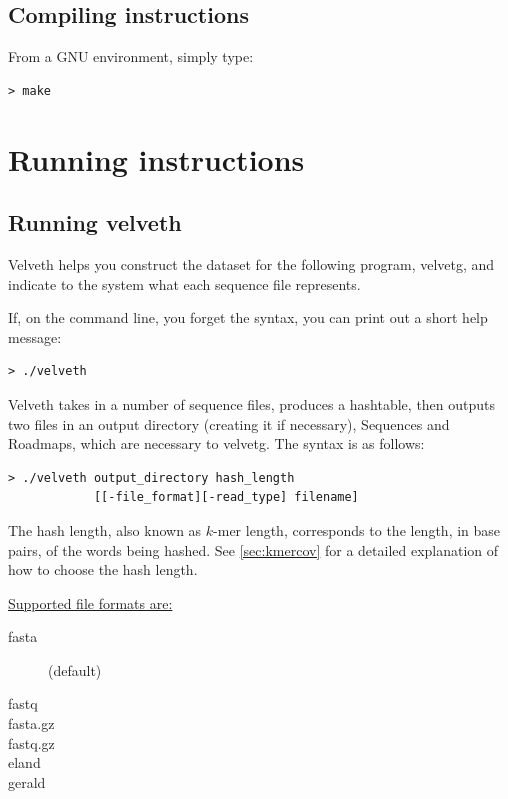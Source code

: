 \documentclass{article}
\begin{document}
\subsection{Compiling instructions}

From a GNU environment, simply type:

\begin{verbatim}
> make
\end{verbatim}

\section{Running instructions}

\subsection{Running velveth}

Velveth helps you construct the dataset for the following program, velvetg, and indicate to the system what  each sequence file represents.

If, on the command line, you forget the syntax, you can print out a short help message:
\begin{verbatim}
> ./velveth
\end{verbatim}

\label{sec:hashing}

Velveth takes in a number of sequence files, produces a hashtable, then outputs two files in an output directory (creating it if necessary), Sequences and Roadmaps, which are necessary to velvetg. The syntax is as follows:

\begin{verbatim}
> ./velveth output_directory hash_length 
            [[-file_format][-read_type] filename]
\end{verbatim}

The hash length, also known as $k$-mer length, corresponds to the length, in base pairs, of the words being hashed. See \ref{sec:kmercov} for a detailed explanation of how to choose the hash length.

\underline{Supported file formats are:}
\begin{description}
\item[fasta] (default) 
\item[fastq]
\item[fasta.gz]
\item[fastq.gz]
\item[eland]
\item[gerald]
\end{description}
\end{document}
